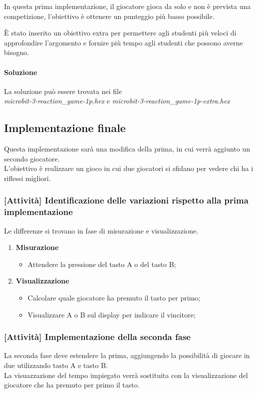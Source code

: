 \documentclass[../../docenti.tex]{subfiles}
\begin{document}
In questa prima implementazione, il giocatore gioca da solo e non è prevista una competizione, l'obiettivo è ottenere un punteggio più basso possibile.

È stato inserito un obiettivo extra per permettere agli studenti più veloci di approfondire l'argomento e fornire più tempo agli studenti che possono averne bisogno.

\paragraph{Soluzione}
La soluzione può essere trovata nei file\\
 \textit{microbit-3-reaction\_game-1p.hex} e \textit{microbit-3-reaction\_game-1p-extra.hex}

\subsection{Implementazione finale}

Questa implementazione sarà una modifica della prima, in cui verrà aggiunto un secondo giocatore.\\
L'obiettivo è realizzare un gioco in cui due giocatori si sfidano per vedere chi ha i riflessi migliori.

\subsubsection{[Attività] Identificazione delle variazioni rispetto alla prima implementazione}
Le differenze si trovano in fase di misurazione e visualizzazione.
\begin{enumerate}
	\item \textbf{Misurazione}
	\begin{itemize}
		\item Attendere la pressione del tasto A o del tasto B;
	\end{itemize}
	\item \textbf{Visualizzazione}
	\begin{itemize}
		\item Calcolare quale giocatore ha premuto il tasto per primo;
		\item Visualizzare A o B sul display per indicare il vincitore;
	\end{itemize}
\end{enumerate}

\subsubsection{[Attività] Implementazione della seconda fase}
La seconda fase deve estendere la prima, aggiungendo la possibilità di giocare in due utilizzando tasto A e tasto B.\\
La visuazzazione del tempo impiegato verrà sostituita con la visualizzazione del giocatore che ha premuto per primo il tasto.
\end{document}
